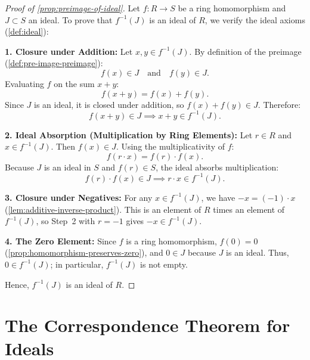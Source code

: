 \begin{content}
\begin{proof}[Proof of \cref{prop:preimage-of-ideal}]
Let $f \colon R \to S$ be a ring homomorphism and $J \subset S$ an ideal. To prove that $f^{-1}(J)$ is an ideal of $R$, we verify the ideal axioms (\cref{def:ideal}):

\textbf{1. Closure under Addition:}
Let $x, y \in f^{-1}(J)$. By definition of the preimage (\cref{def:pre-image-preimage}):
\[
f(x) \in J \quad \text{and} \quad f(y) \in J.
\]
Evaluating $f$ on the sum $x + y$:
\[
f(x + y) = f(x) + f(y).
\]
Since $J$ is an ideal, it is closed under addition, so $f(x) + f(y) \in J$. Therefore:
\[
f(x + y) \in J \implies x + y \in f^{-1}(J).
\]

\textbf{2. Ideal Absorption (Multiplication by Ring Elements):}
Let $r \in R$ and $x \in f^{-1}(J)$. Then $f(x) \in J$. Using the multiplicativity of $f$:
\[
f(r \cdot x) = f(r) \cdot f(x).
\]
Because $J$ is an ideal in $S$ and $f(r) \in S$, the ideal absorbs multiplication:
\[
f(r) \cdot f(x) \in J \implies r \cdot x \in f^{-1}(J).
\]

\textbf{3. Closure under Negatives:}
For any $x \in f^{-1}(J)$, we have $-x = (-1) \cdot x$ (\cref{lem:additive-inverse-product}). This is an element of $R$ times an element of $f^{-1}(J)$, so Step~2 with $r = -1$ gives $-x \in f^{-1}(J)$.

\textbf{4. The Zero Element:}
Since $f$ is a ring homomorphism, $f(0) = 0$ (\cref{prop:homomorphism-preserves-zero}), and $0 \in J$ because $J$ is an ideal. Thus, $0 \in f^{-1}(J)$; in particular, $f^{-1}(J)$ is not empty.

Hence, $f^{-1}(J)$ is an ideal of $R$.
\end{proof}
\end{content}

\begin{hidden}
\end{hidden}

\section{The Correspondence Theorem for Ideals}

